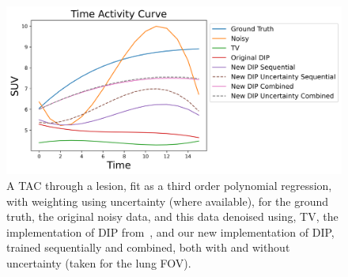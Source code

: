         \begin{figure}
            \centering
            
            \includegraphics[width=1.0\linewidth]{figures/deep_image_prior_results_tac.png}
            
            \captionsetup{singlelinecheck=false, justification=centering}
            \caption{
                A \gls{TAC} through a lesion, fit as a third order polynomial regression, with weighting using uncertainty (where available), for the ground truth, the original noisy data, and this data denoised using, \gls{TV}, the implementation of \gls{DIP} from~\parencite{Gong2019PETPrior}, and our new implementation of \gls{DIP}, trained sequentially and combined, both with and without uncertainty (taken for the lung \gls{FOV}).
            }
            \label{fig:pseudo_bayesian_dip_denoising_as_a_preprocessing_step_for_kinetic_modelling_in_dynamic_pet_appendix_results_tac}
        \end{figure}
        
